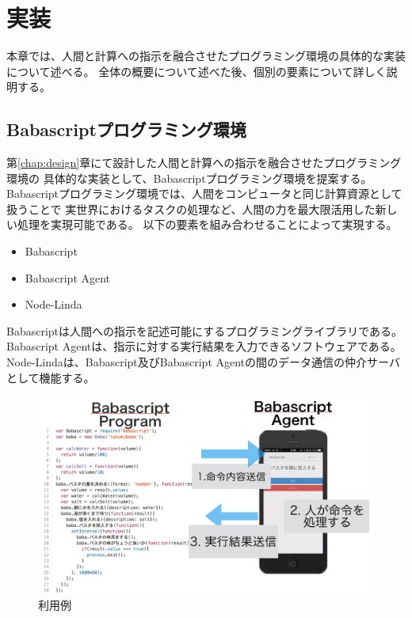 \chapter{実装}\label{chap:implementation}

本章では、人間と計算への指示を融合させたプログラミング環境の具体的な実装について述べる。
全体の概要について述べた後、個別の要素について詳しく説明する。

\newpage

\section{Babascriptプログラミング環境}\label{babascriptux30d7ux30edux30b0ux30e9ux30dfux30f3ux30b0ux74b0ux5883}

第\ref{chap:design}章にて設計した人間と計算への指示を融合させたプログラミング環境の
具体的な実装として、Babascriptプログラミング環境を提案する。
Babascriptプログラミング環境では、人間をコンピュータと同じ計算資源として扱うことで
実世界におけるタスクの処理など、人間の力を最大限活用した新しい処理を実現可能である。
以下の要素を組み合わせることによって実現する。

\begin{itemize}
\itemsep1pt\parskip0pt
\item
  Babascript
\item
  Babascript Agent
\item
  Node-Linda
\end{itemize}

Babascriptは人間への指示を記述可能にするプログラミングライブラリである。
Babascript Agentは、指示に対する実行結果を入力できるソフトウェアである。
Node-Lindaは、Babascript及びBabascript
Agentの間のデータ通信の仲介サーバとして機能する。

\begin{figure}[htbp]
  \begin{center}
  \includegraphics[width=.7\linewidth,bb=0 0 1007 592]{images/overview-using.png}
  \end{center}
  \caption{利用例}
  \label{fig:overview_using}
\end{figure}

